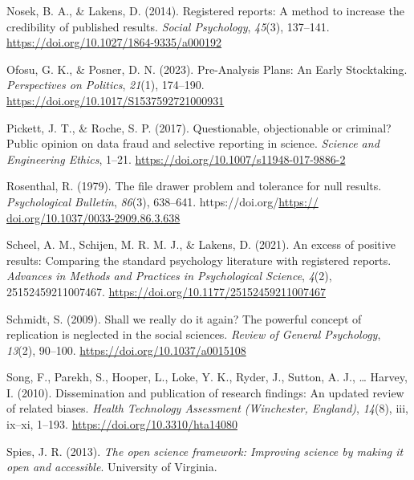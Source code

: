\documentclass[
  ,man, a4paper,floatsintext]{apa6}
\newlength{\cslhangindent}
\newenvironment{CSLReferences}[2] %
 {\begin{list}{}{%
  \setlength{\itemindent}{0pt}
  \setlength{\leftmargin}{0pt}
  \setlength{\parsep}{0pt}
  \ifodd #1
   \setlength{\leftmargin}{\cslhangindent}
   \setlength{\itemindent}{-1\cslhangindent}
  \fi
  \setlength{\itemsep}{#2\baselineskip}}}
 {\end{list}}
\begin{document}
\begin{CSLReferences}{1}{0}
Nosek, B. A., \& Lakens, D. (2014). Registered reports: {A} method to increase the credibility of published results. \emph{Social Psychology}, \emph{45}(3), 137--141. \url{https://doi.org/10.1027/1864-9335/a000192}

Ofosu, G. K., \& Posner, D. N. (2023). Pre-{Analysis Plans}: {An Early Stocktaking}. \emph{Perspectives on Politics}, \emph{21}(1), 174--190. \url{https://doi.org/10.1017/S1537592721000931}

Pickett, J. T., \& Roche, S. P. (2017). Questionable, objectionable or criminal? {Public} opinion on data fraud and selective reporting in science. \emph{Science and Engineering Ethics}, 1--21. \url{https://doi.org/10.1007/s11948-017-9886-2}

Rosenthal, R. (1979). The file drawer problem and tolerance for null results. \emph{Psychological Bulletin}, \emph{86}(3), 638--641. https://doi.org/\href{https://\%20doi.org/10.1037/0033-2909.86.3.638}{https:// doi.org/10.1037/0033-2909.86.3.638}

Scheel, A. M., Schijen, M. R. M. J., \& Lakens, D. (2021). An excess of positive results: {Comparing} the standard psychology literature with registered reports. \emph{Advances in Methods and Practices in Psychological Science}, \emph{4}(2), 25152459211007467. \url{https://doi.org/10.1177/25152459211007467}

Schmidt, S. (2009). Shall we really do it again? {The} powerful concept of replication is neglected in the social sciences. \emph{Review of General Psychology}, \emph{13}(2), 90--100. \url{https://doi.org/10.1037/a0015108}

Song, F., Parekh, S., Hooper, L., Loke, Y. K., Ryder, J., Sutton, A. J., \ldots{} Harvey, I. (2010). Dissemination and publication of research findings: An updated review of related biases. \emph{Health Technology Assessment (Winchester, England)}, \emph{14}(8), iii, ix--xi, 1--193. \url{https://doi.org/10.3310/hta14080}

Spies, J. R. (2013). \emph{The open science framework: {Improving} science by making it open and accessible}. University of Virginia.


\end{CSLReferences}
\end{document}

